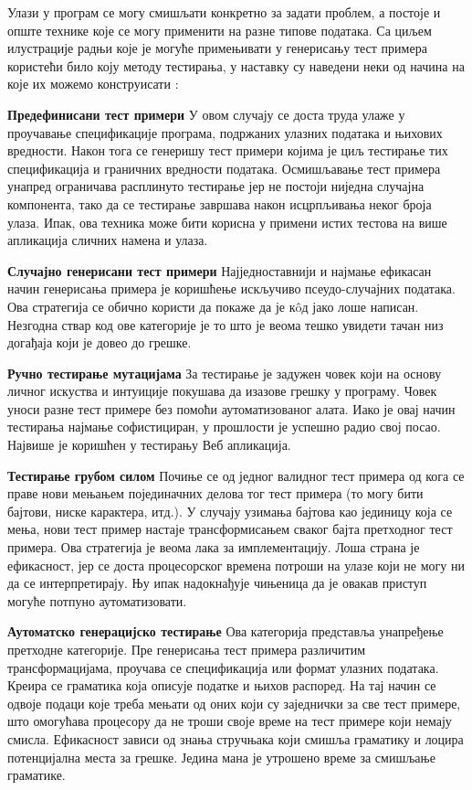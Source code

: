 \documentclass[12pt,oneside]{memoir}
\begin{document}
Улази у програм се могу смишљати конкретно за задати проблем, а постоје и опште технике које се могу применити на разне типове података. Са циљем илустрације радњи које је могуће примењивати у генерисању тест примера користећи било коју методу тестирања, у наставку су наведени неки од начина на које их можемо конструисати \cite{fuzzingBrute}:
\begin{description}
\item \textbf{Предефинисани тест примери} У овом случају се доста труда улаже у проучавање спецификације програма, подржаних улазних података и њихових вредности. Након тога се генеришу тест примери којима је циљ тестирање тих спецификација и граничних вредности података. Осмишљавање тест примера унапред ограничава расплинуто тестирање јер не постоји ниједна случајна компонента, тако да се тестирање завршава након исцрпљивања неког броја улаза. Ипак, ова техника може бити корисна у примени истих тестова на више апликација сличних намена и улаза.
\item \textbf{Случајно генерисани тест примери} Најједноставнији и најмање ефикасан начин генерисања примера је коришћење искључиво псеудо-случајних података. Ова стратегија се обично користи да покаже да је к\^{o}д јако лоше написан. Незгодна ствар код ове категорије је то што је веома тешко увидети тачан низ догађаја који је довео до грешке.
\item \textbf{Ручно тестирање мутацијама} За тестирање је задужен човек који на основу личног искуства и интуиције покушава да изазове грешку у програму. Човек уноси разне тест примере без помоћи  аутоматизованог алата. Иако је овај начин тестирања најмање софистициран, у прошлости је успешно радио свој посао. Највише је коришћен у тестирању Веб апликација.
\item \textbf{Тестирање грубом силом} Почиње се од једног валидног тест примера од кога се праве нови мењањем појединачних делова тог тест примера (то могу бити бајтови, ниске карактера, итд.). У случају узимања бајтова као јединицу која се мења, нови тест пример настаје трансформисањем сваког бајта претходног тест примера. Ова стратегија је веома лака за имплементацију. Лоша страна је ефикасност, јер се доста процесорског времена потроши на улазе који не могу ни да се интерпретирају. Њу ипак надокнађује чињеница да је овакав приступ могуће потпуно аутоматизовати. 
\item \textbf{Аутоматско генерацијско тестирање} Ова категорија представља унапређење претходне категорије. Пре генерисања тест примера различитим трансформацијама, проучава се спецификација или формат улазних података. Креира се граматика која описује податке и њихов распоред. На тај начин се одвоје подаци које треба мењати од оних који су заједнички за све тест примере, што омогућава процесору да не троши своје време на тест примере који немају смисла. Ефикасност зависи од знања стручњака који смишља граматику и лоцира потенцијална места за грешке. Једина мана је утрошено време за смишљање граматике.
\end{description}
\end{document}

